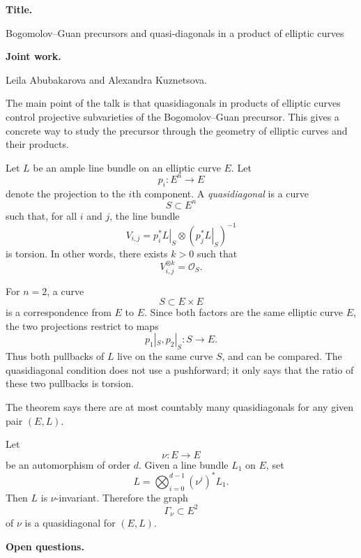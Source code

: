 \medskip\noindent
{\bf Title.}

Bogomolov--Guan precursors and
quasi-diagonals in a product of
elliptic curves

\medskip\noindent
{\bf Joint work.}

Leila Abubakarova and Alexandra
Kuznetsova.

The main point of the talk is that
quasidiagonals in products of elliptic
curves control projective subvarieties
of the Bogomolov--Guan precursor.
This gives a concrete way to study the
precursor through the geometry of
elliptic curves and their products.

\begin{definition}
\label{definition-let-l}
Let $L$ be an ample line bundle on an
elliptic curve $E$.
Let
\[
p_i:E^n\to E
\]
denote the projection to the $i$th
component.
A {\it quasidiagonal} is a curve
\[
S\subset E^n
\]
such that, for all $i$ and $j$, the
line bundle
\[
V_{i,j}
=
\left.
p_i^*L
\right|_S
\otimes
\left(
\left.
p_j^*L
\right|_S
\right)^{-1}
\]
is torsion.
In other words, there exists $k>0$
such that
\[
V_{i,j}^{\otimes k}
=
\mathcal{O}_S.
\]
\end{definition}

\begin{remark}
\label{remark-n-2}
For $n=2$, a curve
\[
S\subset E\times E
\]
is a correspondence from $E$ to $E$.
Since both factors are the same
elliptic curve $E$, the two
projections restrict to maps
\[
p_1|_S,p_2|_S:S\to E.
\]
Thus both pullbacks of $L$ live on the
same curve $S$, and can be compared.
The quasidiagonal condition does not
use a pushforward; it only says that
the ratio of these two pullbacks is
torsion.
\end{remark}

The theorem says there are at most
countably many quasidiagonals for any
given pair $(E,L)$.

\begin{example}
\label{example-let-e}
Let
\[
\nu:E\to E
\]
be an automorphism of order $d$.
Given a line bundle $L_1$ on $E$, set
\[
L=
\bigotimes_{i=0}^{d-1}(\nu^i)^*L_1.
\]
Then $L$ is $\nu$-invariant.
Therefore the graph
\[
\Gamma_\nu\subset E^2
\]
of $\nu$ is a quasidiagonal for
$(E,L)$.
\end{example}

\medskip\noindent
{\bf Open questions.}


